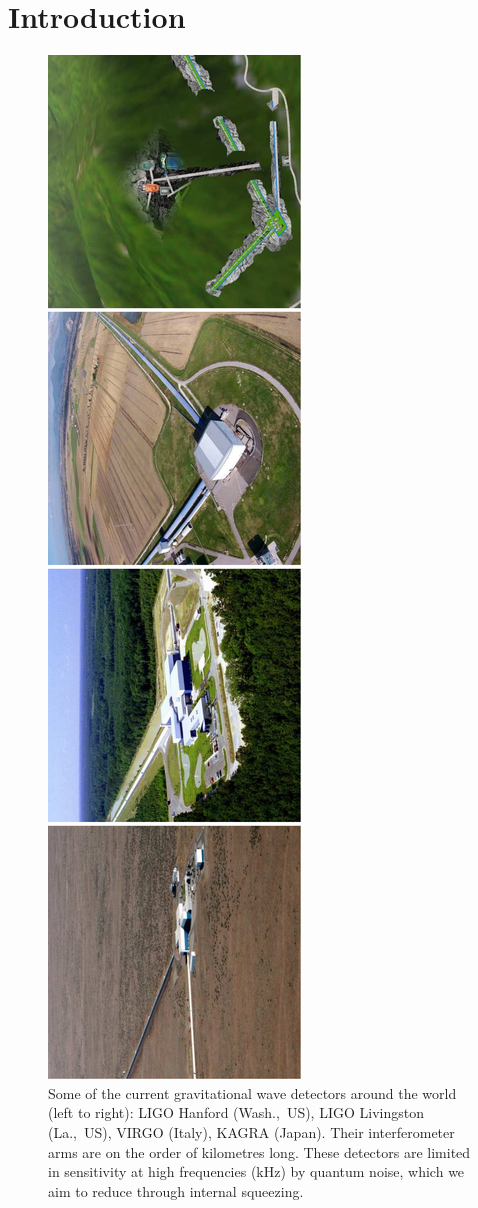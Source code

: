 \documentclass[aps,pra,superscriptaddress,reprint,nofootinbib]{revtex4-1}
\begin{document}
\maketitle

\section{Introduction}
\label{sec:introduction}

\begin{figure}[ht!]
	\begin{center}
	\includegraphics[height=.8\textwidth,angle=-90]{figures/gwo_ifos-pictures.pdf}
	\end{center}
	\caption{Some of the current gravitational wave detectors around the world (left to right): LIGO Hanford (Wash.,~US), LIGO Livingston (La.,~US), VIRGO (Italy), KAGRA (Japan). Their interferometer arms are on the order of kilometres long. These detectors are limited in sensitivity at high frequencies (kHz) by quantum noise, which we aim to reduce through internal squeezing.}
	\label{fig:gw_ifos}
\end{figure}
\end{document}
